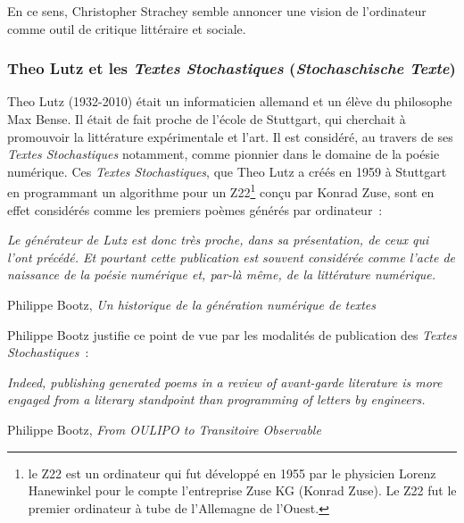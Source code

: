 \documentclass{article}
\newenvironment{citationbox}
{\begin{center}
		\begin{minipage}{.8\textwidth}
		}
		{
		\end{minipage}	
\end{center}
}
\begin{document}
				En ce sens, Christopher Strachey semble annoncer une vision de l'ordinateur comme outil de critique littéraire et sociale.
		
			\subsubsection{Theo Lutz et les \textit{Textes Stochastiques} (\textit{Stochaschische Texte})}
				Theo Lutz (1932-2010) était un informaticien allemand et un élève du philosophe Max Bense. Il était de fait proche de l'école de Stuttgart, qui cherchait à promouvoir la littérature expérimentale et l'art.  Il  est considéré, au travers de ses \textit{Textes Stochastiques} notamment, comme pionnier dans le domaine de la poésie numérique. Ces \textit{Textes Stochastiques}, que Theo Lutz a créés en 1959 à Stuttgart en programmant un algorithme pour un Z22\footnote{le Z22 est un ordinateur qui fut développé en 1955 par le physicien Lorenz Hanewinkel pour le compte l'entreprise Zuse KG (Konrad Zuse). Le Z22 fut le premier ordinateur à tube de l'Allemagne de l'Ouest.} conçu par Konrad Zuse, sont en effet considérés comme les premiers poèmes générés par ordinateur :
				\begin{citationbox}
					\textit{Le générateur de Lutz est donc très proche, dans sa présentation, de ceux qui l'ont précédé. Et pourtant cette publication est souvent considérée comme l'acte de naissance de la poésie numérique et, par-là même, de la littérature numérique.}
					\begin{flushright}
						Philippe Bootz, \textit{Un historique de la génération numérique de textes}\cite{bootz}
					\end{flushright}
				\end{citationbox}
				Philippe Bootz justifie ce point de vue par les modalités de publication des \textit{Textes Stochastiques}~:
				
				\begin{citationbox}
					\textit{Indeed, publishing generated poems in a review of avant-garde literature is more engaged from a literary standpoint than programming of letters by engineers.}
					\begin{flushright}
						Philippe Bootz, \textit{From OULIPO to Transitoire Observable} \cite{bootz2012}
					\end{flushright}
				\end{citationbox}
				
\end{document}
